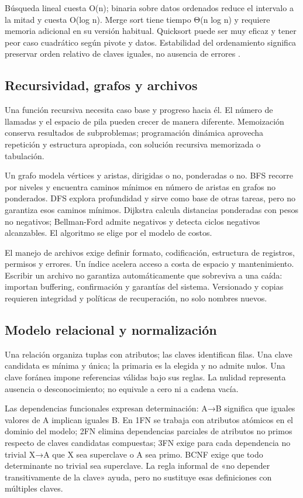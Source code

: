 Búsqueda lineal cuesta O(n); binaria sobre datos ordenados reduce el intervalo a la mitad y cuesta O(log n). Merge sort tiene tiempo Θ(n log n) y requiere memoria adicional en su versión habitual. Quicksort puede ser muy eficaz y tener peor caso cuadrático según pivote y datos. Estabilidad del ordenamiento significa preservar orden relativo de claves iguales, no ausencia de errores \cite[capítulos Recursion, Dynamic Programming, Graphs y Shortest Paths]{algorithms}.

\subsection{Recursividad, grafos y archivos}
Una función recursiva necesita caso base y progreso hacia él. El número de llamadas y el espacio de pila pueden crecer de manera diferente. Memoización conserva resultados de subproblemas; programación dinámica aprovecha repetición y estructura apropiada, con solución recursiva memorizada o tabulación.

Un grafo modela vértices y aristas, dirigidas o no, ponderadas o no. BFS recorre por niveles y encuentra caminos mínimos en número de aristas en grafos no ponderados. DFS explora profundidad y sirve como base de otras tareas, pero no garantiza esos caminos mínimos. Dijkstra calcula distancias ponderadas con pesos no negativos; Bellman-Ford admite negativos y detecta ciclos negativos alcanzables. El algoritmo se elige por el modelo de costos.

El manejo de archivos exige definir formato, codificación, estructura de registros, permisos y errores. Un índice acelera acceso a costa de espacio y mantenimiento. Escribir un archivo no garantiza automáticamente que sobreviva a una caída: importan buffering, confirmación y garantías del sistema. Versionado y copias requieren integridad y políticas de recuperación, no solo nombres nuevos.

\subsection{Modelo relacional y normalización}
Una relación organiza tuplas con atributos; las claves identifican filas. Una clave candidata es mínima y única; la primaria es la elegida y no admite nulos. Una clave foránea impone referencias válidas bajo sus reglas. La nulidad representa ausencia o desconocimiento; no equivale a cero ni a cadena vacía.

Las dependencias funcionales expresan determinación: A→B significa que iguales valores de A implican iguales B. En 1FN se trabaja con atributos atómicos en el dominio del modelo; 2FN elimina dependencias parciales de atributos no primos respecto de claves candidatas compuestas; 3FN exige para cada dependencia no trivial X→A que X sea superclave o A sea primo. BCNF exige que todo determinante no trivial sea superclave. La regla informal de «no depender transitivamente de la clave» ayuda, pero no sustituye esas definiciones con múltiples claves.

